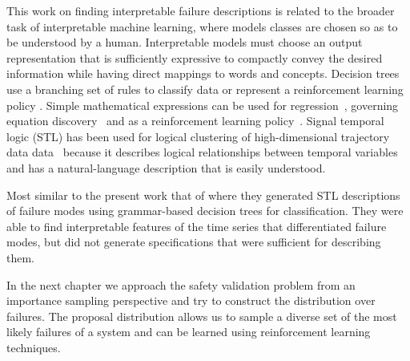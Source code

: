 This work on finding interpretable failure descriptions is related to the broader task of interpretable machine learning, where models classes are chosen so as to be understood by a human. Interpretable models must choose an output representation that is sufficiently expressive to compactly convey the desired information while having direct mappings to words and concepts. Decision trees use a branching set of rules to classify data \cite{breiman2017classification} or represent a reinforcement learning policy \cite{rodriguez2019interpretable}. Simple mathematical expressions can be used for regression~\cite{schielzeth2010simple}, governing equation discovery~\cite{brunton2016discovering} and as a reinforcement learning policy~\cite{hein2017particle}. Signal temporal logic (STL) has been used for logical clustering of high-dimensional trajectory data data~\cite{lee2018interpretable,vazquez2017logical} because it describes logical relationships between temporal variables and has a natural-language description that is easily understood.

Most similar to the present work that of \textcite{lee2018interpretable} where they generated STL descriptions of failure modes using grammar-based decision trees for classification. They were able to find interpretable features of the time series that differentiated failure modes, but did not generate specifications that were sufficient for describing them. 

In the next chapter we approach the safety validation problem from an importance sampling perspective and try to construct the distribution over failures. The proposal distribution allows us to sample a diverse set of the most likely failures of a system and can be learned using reinforcement learning techniques. 